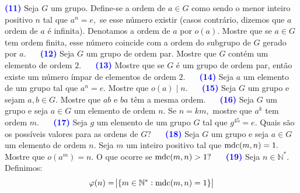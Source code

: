 \documentclass[12pt, a4paper]{article}
\newcommand{\mdc}{{\rm mdc}}
\begin{document}
\textcolor{blue}{\bf(11)}\label{19} Seja $G$ um grupo. Define-se a ordem de $a \in G$ como sendo o menor inteiro positivo $n$ tal que $a^n = e,$ se esse número existir (casos contrário, dizemos que $a$ ordem de $a$ é infinita). Denotamos a ordem de $a$ por $o(a).$ Mostre que se $a \in G$ tem ordem finita, esse número coincide com a ordem do subgrupo de $G$ gerado por $a.$
\textcolor{white}{Oi}\newline\newline
\textcolor{blue}{\bf(12)}\label{20} Seja $G$ um grupo de ordem par. Mostre que $G$ contém um elemento de ordem $2.$
\textcolor{white}{Oi}\newline\newline
\textcolor{blue}{\bf(13)}\label{21} Mostre que se $G$ é um grupo de ordem par, então existe um número ímpar de elementos de ordem $2.$
\textcolor{white}{Oi}\newline\newline
\textcolor{blue}{\bf(14)}\label{22} Seja $a$ um elemento de um grupo tal que $a^n = e.$ Mostre que $o(a) \mid n.$
\textcolor{white}{Oi}\newline\newline
\textcolor{blue}{\bf(15)}\label{23} Seja $G$ um grupo e sejam $a,b \in G.$ Mostre que $ab$ e $ba$ têm a mesma ordem.
\textcolor{white}{Oi}\newline\newline
\textcolor{blue}{\bf(16)}\label{24} Seja $G$ um grupo e seja $a \in G$ um elemento de ordem $n.$ Se $n = km,$ mostre que $a^k$ tem ordem $m.$
\textcolor{white}{Oi}\newline\newline
\textcolor{blue}{\bf(17)}\label{ex3}  Seja $g$ um elemento de um grupo $G$ tal que $g^{45} = e.$ Quais são os possíveis valores para as ordens de $G?$
\textcolor{white}{Oi}\newline\newline
\textcolor{blue}{\bf(18)}\label{25} Seja $G$ um grupo e seja $a \in G$  um elemento de ordem $n$. Seja  $m$ um inteiro positivo tal que $\mdc(m,n) = 1.$ Mostre que $o(a^m) = n.$ O que ocorre se $\mdc(m,n) > 1?$
\textcolor{white}{Oi}\newline\newline
\textcolor{blue}{\bf(19)}\label{26} Seja $n \in \mathbb{N}^{*}.$ Definimos:
\[
\varphi(n) = \abs{\{ m \in \mathbb{N}^{*} : \mdc(m,n) = 1 \}}
\]
\end{document}

